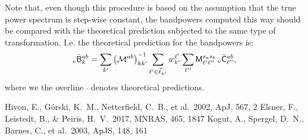 \documentclass[a4paper,10pt]{article}
\newcommand{\apj}{ApJ}
\newcommand{\apjs}{ApJS}
\newcommand{\mnras}{MNRAS}
\begin{document}
  Note that, even though this procedure is based on the assumption that the true power spectrum is step-wise constant, the bandpowers computed this way should be compared with the theoretical prediction subjected to the same type of transformation. I.e. the theoretical prediction for the bandpowers is:
  \begin{equation}
    _v\bar{\sf B}^{ab}_k=\sum_{k'}\left(\mathcal{M}^{ab}\right)^{-1}_{kk'}\sum_{\ell'\in\vec{\ell}_{k'}}w_{k'}^{\ell'}\sum_{\ell''}{\sf M}^{s_as_b}_{\ell'\ell''}\,_v\bar{\sf C}^{ab}_{\ell''},
  \end{equation}
  where we the overline $\bar{\,}$ denotes theoretical predictions.

\begin{thebibliography}{}
  Hivon, E., G{\'o}rski, K.~M., Netterfield, C.~B., et al.\ 2002, \apj, 567, 2 
  Elsner, F., Leistedt, B., \& Peiris, H.~V.\ 2017, \mnras, 465, 1847 
  Kogut, A., Spergel, D.~N., Barnes, C., et al.\ 2003, \apjs, 148, 161 
\end{thebibliography}
\end{document}
